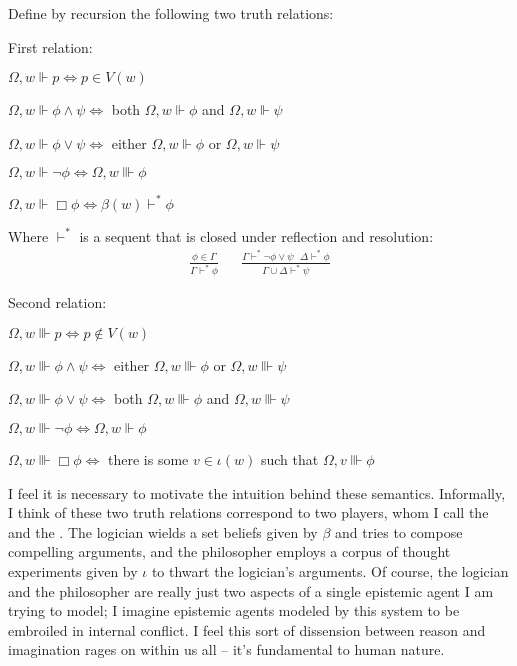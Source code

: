 \begin{definition}
  Define by recursion the following two truth relations:
  
  First relation:
  \begin{empt}
    \item $\Omega, w \Vdash p \Longleftrightarrow p \in V (w)$
    \item $\Omega, w \Vdash \phi \wedge \psi \Longleftrightarrow$ both $\Omega,
    w \Vdash \phi$ and $\Omega, w \Vdash \psi$
    \item $\Omega, w \Vdash \phi \vee \psi \Longleftrightarrow$ either $\Omega,
    w \Vdash \phi$ or $\Omega, w \Vdash \psi$
    \item $\Omega, w \Vdash \neg \phi \Longleftrightarrow \Omega, w \Vvdash
    \phi$
    \item $\Omega, w \Vdash \Box \phi \Longleftrightarrow \beta (w)
    \vdash^{\ast} \phi$
    
    Where $\vdash^{\ast}$ is a sequent that is closed under reflection
    and resolution:
    \begin{eqnarray*}
      \frac{\phi \in \Gamma}{\Gamma \vdash^{\ast} \phi} &  & \frac{\Gamma
      \vdash^{\ast} \neg \phi \vee \psi \ \ \  \Delta \vdash^{\ast}
      \phi}{\Gamma \cup \Delta \vdash^{\ast} \psi}
    \end{eqnarray*}
  \end{empt}
  Second relation:
  \begin{empt}
    \item $\Omega, w \Vvdash p \Longleftrightarrow p \nin V (w)$
    \item $\Omega, w \Vvdash \phi \wedge \psi \Longleftrightarrow$ either $\Omega, w \Vvdash \phi$ or $\Omega, w \Vvdash \psi$
    \item $\Omega, w \Vvdash \phi \vee \psi \Longleftrightarrow$ both $\Omega,
    w \Vvdash \phi$ and $\Omega, w \Vvdash \psi$
    \item $\Omega, w \Vvdash \neg \phi \Longleftrightarrow \Omega, w \Vdash
    \phi$
    \item $\Omega, w \Vvdash \Box \phi \Longleftrightarrow$ there is some $v
    \in \iota (w)$ such that $\Omega, v \Vvdash \phi$
  \end{empt}
\end{definition}

I feel it is necessary to motivate the intuition behind these semantics.  
Informally, I think of these two truth relations correspond to two players, whom I call the
{} and the {}.   The logician wields a set
beliefs given by $\beta$ and tries to compose compelling arguments, and the
philosopher employs a corpus of thought experiments given by $\iota$ to thwart
the logician's arguments.   Of course, the logician and the philosopher are
really just two aspects of a single epistemic agent I am trying to model; I
imagine epistemic agents modeled by this system to be embroiled in internal
conflict. I feel this sort of dissension between reason and imagination rages
on within us all -- it's fundamental to human nature.

